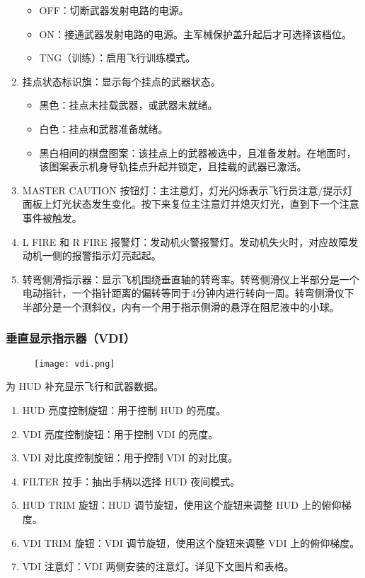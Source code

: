 \begin{enumerate}
\begin{itemize}
		      \item OFF：切断武器发射电路的电源。
		      \item ON：接通武器发射电路的电源。主军械保护盖升起后才可选择该档位。
		      \item TNG（训练）：启用飞行训练模式。
	      \end{itemize}
	\item 挂点状态标识旗：显示每个挂点的武器状态。
	      \begin{itemize}
		      \item 黑色：挂点未挂载武器，或武器未就绪。
		      \item 白色：挂点和武器准备就绪。
		      \item 黑白相间的棋盘图案：该挂点上的武器被选中，且准备发射。在地面时，该图案表示机身导轨挂点升起并锁定，且挂载的武器已激活。
	      \end{itemize}
	\item MASTER CAUTION 按钮灯：主注意灯，灯光闪烁表示飞行员注意/提示灯面板上灯光状态发生变化。按下来复位主注意灯并熄灭灯光，直到下一个注意事件被触发。
	\item L FIRE 和 R FIRE 报警灯：发动机火警报警灯。发动机失火时，对应故障发动机一侧的报警指示灯亮起起。
	\item 转弯侧滑指示器：显示飞机围绕垂直轴的转弯率。转弯侧滑仪上半部分是一个电动指针，一个指针距离的偏转等同于4分钟内进行转向一周。转弯侧滑仪下半部分是一个测斜仪，内有一个用于指示侧滑的悬浮在阻尼液中的小球。
\end{enumerate}

\subsubsection{垂直显示指示器（VDI）}

\begin{figure}[htb]
	\centering
	\texttt{[image: vdi.png]}
\end{figure}
为 HUD 补充显示飞行和武器数据。

\begin{enumerate}
	\item HUD 亮度控制旋钮：用于控制 HUD 的亮度。
	\item VDI 亮度控制旋钮：用于控制 VDI 的亮度。
	\item VDI 对比度控制旋钮：用于控制 VDI 的对比度。
	\item FILTER 拉手：抽出手柄以选择 HUD 夜间模式。
	\item HUD TRIM 旋钮：HUD 调节旋钮，使用这个旋钮来调整 HUD 上的俯仰梯度。
	\item VDI TRIM 旋钮：VDI 调节旋钮，使用这个旋钮来调整 VDI 上的俯仰梯度。
	\item VDI 注意灯：VDI 两侧安装的注意灯。详见下文图片和表格。
\end{enumerate}

